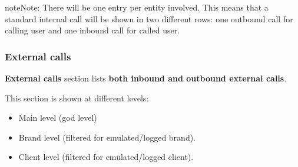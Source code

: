 \documentclass[letterpaper,10pt,english]{sphinxmanual}
\begin{document}
\begin{notice}{note}{Note:}
There will be one entry per entity involved. This means that a standard internal call will be shown
in two different rows: one outbound call for calling user and one inbound call for called user.
\end{notice}


\subsubsection{External calls}
\label{administration_portal/client/retail/calls/external_calls:id1}\label{administration_portal/client/retail/calls/external_calls::doc}\label{administration_portal/client/retail/calls/external_calls:external-calls}
\textbf{External calls} section lists \textbf{both inbound and outbound external calls}.

This section is shown at different levels:
\begin{itemize}
\item {} 
Main level (god level)

\item {} 
Brand level (filtered for emulated/logged brand).

\item {} 
Client level (filtered for emulated/logged client).

\end{itemize}
\end{document}
